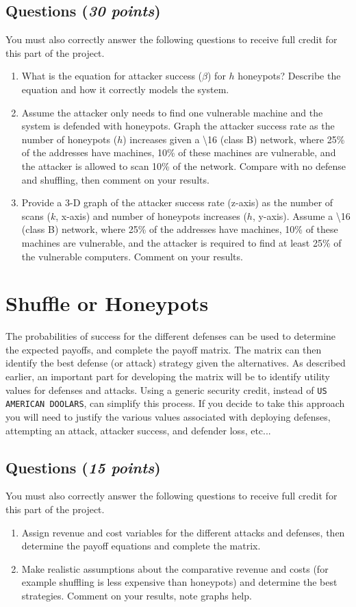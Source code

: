 \documentclass[10pt]{article}
\newcommand{\Questions}[1]{
\subsection*{Questions {\rm \normalsize (\textsf{\textit{#1 points}})}}
}
\begin{document}
\Questions{30}
You must also correctly answer the following questions to receive full credit for this part of the project.
\begin{enumerate}
  \item What is the equation for attacker success ($\beta$) for $h$ honeypots? Describe the equation and how it correctly models the system.
  \item Assume the attacker only needs to find one vulnerable machine and the system is defended with honeypots. Graph the attacker success rate as the number of honeypots ($h$) increases given a  \textbackslash 16 (class B) network, where 25\% of the addresses have machines, 10\% of these machines are vulnerable, and the attacker is allowed to scan 10\% of the network. Compare with no defense and shuffling, then comment on your results.
    \item Provide a 3-D graph of the attacker success rate (z-axis) as the number of scans ($k$, x-axis) and number of honeypots increases ($h$, y-axis). Assume a  \textbackslash 16 (class B) network, where 25\% of the addresses have machines, 10\% of these machines are vulnerable, and the attacker is required to find at least 25\% of the vulnerable computers. Comment on your results.
\end{enumerate}

\section{Shuffle or Honeypots}

The probabilities of success for the different defenses can be used to determine the expected payoffs, and complete the payoff matrix. The matrix can then identify the best defense (or attack) strategy given the alternatives. As described earlier, an important part for developing the matrix will be to identify utility values for defenses and attacks. Using a generic security credit, instead of \texttt{US AMERICAN DOOLARS}, can simplify this process. If you decide to take this approach you will need to justify the various values associated with deploying defenses, attempting an attack, attacker success, and defender loss, etc...

\Questions{15}
You must also correctly answer the following questions to receive full credit for this part of the project.
\begin{enumerate}
  \item Assign revenue and cost variables for the different attacks and defenses, then determine the payoff equations and complete the matrix.
  \item Make realistic assumptions about the comparative revenue and costs (for example shuffling is less expensive than honeypots) and determine the best strategies. Comment on your results, note graphs help.
\end{enumerate}
\end{document}
